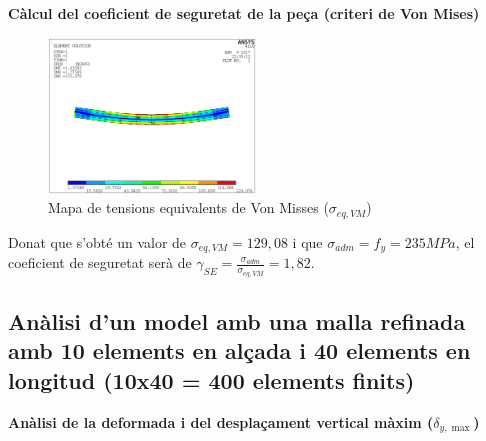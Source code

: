 \documentclass[a4paper]{article}
\def\imgS{0.49\textwidth}
\begin{document}
\textbf{Càlcul del coeficient de seguretat de la peça (criteri de Von Mises)}
\begin{figure}[H]
	\centering
	\includegraphics[width=\imgS]{images/40_von_misses}
	\caption{Mapa de tensions equivalents de Von Misses ($\sigma_{eq,VM}$)}
	\label{fig:40_von_misses}
\end{figure}

Donat que s'obté un valor de $\sigma_{eq,VM} = 129,08$ i que $\sigma_{adm} = f_y = 235 MPa$, el coeficient de seguretat serà de $\gamma_{SE} = \frac{\sigma_{adm}}{\sigma_{eq,VM}} = 1,82$.

\subsection{Anàlisi d'un model amb una malla refinada amb 10 elements en alçada i 40 elements en longitud (10x40 = 400 elements finits)}
\textbf{Anàlisi de la deformada i del desplaçament vertical màxim ($\delta_{y, \max}$)}
\end{document}
